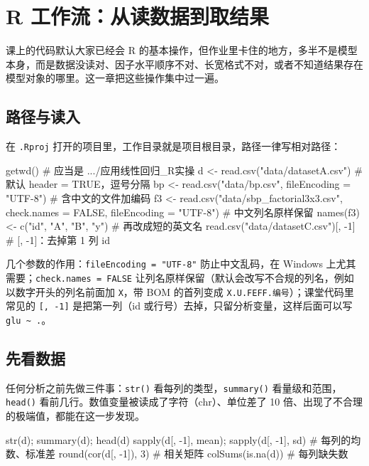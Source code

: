 \section{R 工作流：从读数据到取结果}

课上的代码默认大家已经会 R 的基本操作，但作业里卡住的地方，多半不是模型本身，而是数据没读对、因子水平顺序不对、长宽格式不对，或者不知道结果存在模型对象的哪里。这一章把这些操作集中过一遍。

\subsection{路径与读入}
在 \Verb|.Rproj| 打开的项目里，工作目录就是项目根目录，路径一律写相对路径：

\begin{RCode}[R · 读入数据]
getwd()                                   # 应当是 .../应用线性回归_R实操
d  <- read.csv("data/datasetA.csv")       # 默认 header = TRUE，逗号分隔
bp <- read.csv("data/bp.csv", fileEncoding = "UTF-8")   # 含中文的文件加编码
f3 <- read.csv("data/sbp_factorial3x3.csv", check.names = FALSE,
               fileEncoding = "UTF-8")    # 中文列名原样保留
names(f3) <- c("id", "A", "B", "y")       # 再改成短的英文名
read.csv("data/datasetC.csv")[, -1]       # [, -1]：去掉第 1 列 id
\end{RCode}

几个参数的作用：\Verb|fileEncoding = "UTF-8"| 防止中文乱码，在 Windows 上尤其需要；\Verb|check.names = FALSE| 让列名原样保留（默认会改写不合规的列名，例如以数字开头的列名前面加 \Verb|X|，带 BOM 的首列变成 \Verb|X.U.FEFF.编号|）；课堂代码里常见的 \Verb|[, -1]| 是把第一列（id 或行号）去掉，只留分析变量，这样后面可以写 \Verb|glu ~ .|。

\subsection{先看数据}
任何分析之前先做三件事：\Verb|str()| 看每列的类型，\Verb|summary()| 看量级和范围，\Verb|head()| 看前几行。数值变量被读成了字符（chr）、单位差了 10 倍、出现了不合理的极端值，都能在这一步发现。

\begin{RCode}[R · 第一眼]
str(d); summary(d); head(d)
sapply(d[, -1], mean); sapply(d[, -1], sd)   # 每列的均数、标准差
round(cor(d[, -1]), 3)                        # 相关矩阵
colSums(is.na(d))                             # 每列缺失数
\end{RCode}


